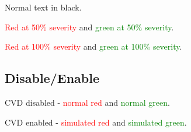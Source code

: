 \documentclass{article}
\begin{document}
Normal text in black.

\textcolor{red}{Red at 50\% severity} and \textcolor{green}{green at 50\% severity}.

\textcolor{red}{Red at 100\% severity} and \textcolor{green}{green at 100\% severity}.

\subsection{Disable/Enable}

\cvddisable
CVD disabled - \textcolor{red}{normal red} and \textcolor{green}{normal green}.

\cvdenable
CVD enabled - \textcolor{red}{simulated red} and \textcolor{green}{simulated green}.

\end{document}
